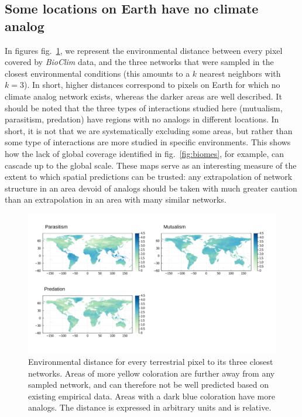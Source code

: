 \documentclass[10pt,oneside]{article}
\makeatletter
\def\maxwidth{\ifdim\Gin@nat@width>\linewidth\linewidth
\else\Gin@nat@width\fi}
\let\Oldincludegraphics\includegraphics
\renewcommand{\includegraphics}[1]{\Oldincludegraphics[width=\maxwidth]{#1}}
\makeatother
\begin{document}
\hypertarget{some-locations-on-earth-have-no-climate-analog}{%
\subsection{Some locations on Earth have no climate
analog}\label{some-locations-on-earth-have-no-climate-analog}}

In figures fig.~\ref{fig:envspace}, we represent the environmental
distance between every pixel covered by \emph{BioClim} data, and the
three networks that were sampled in the closest environmental conditions
(this amounts to a \(k\) nearest neighbors with \(k = 3\)). In short,
higher distances correspond to pixels on Earth for which no climate
analog network exists, whereas the darker areas are well described. It
should be noted that the three types of interactions studied here
(mutualism, parasitism, predation) have regions with no analogs in
different locations. In short, it is not that we are systematically
excluding some areas, but rather than some type of interactions are more
studied in specific environments. This shows how the lack of global
coverage identified in fig.~\ref{fig:biomes}, for example, can cascade
up to the global scale. These maps serve as an interesting measure of
the extent to which spatial predictions can be trusted: any
extrapolation of network structure in an area devoid of analogs should
be taken with much greater caution than an extrapolation in an area with
many similar networks.

\begin{figure}
\hypertarget{fig:envspace}{%
\centering
\includegraphics{figures/combined_envirodist_maps.png}
\caption{Environmental distance for every terrestrial pixel to its three
closest networks. Areas of more yellow coloration are further away from
any sampled network, and can therefore not be well predicted based on
existing empirical data. Areas with a dark blue coloration have more
analogs. The distance is expressed in arbitrary units and is
relative.}\label{fig:envspace}
}
\end{figure}
\end{document}
